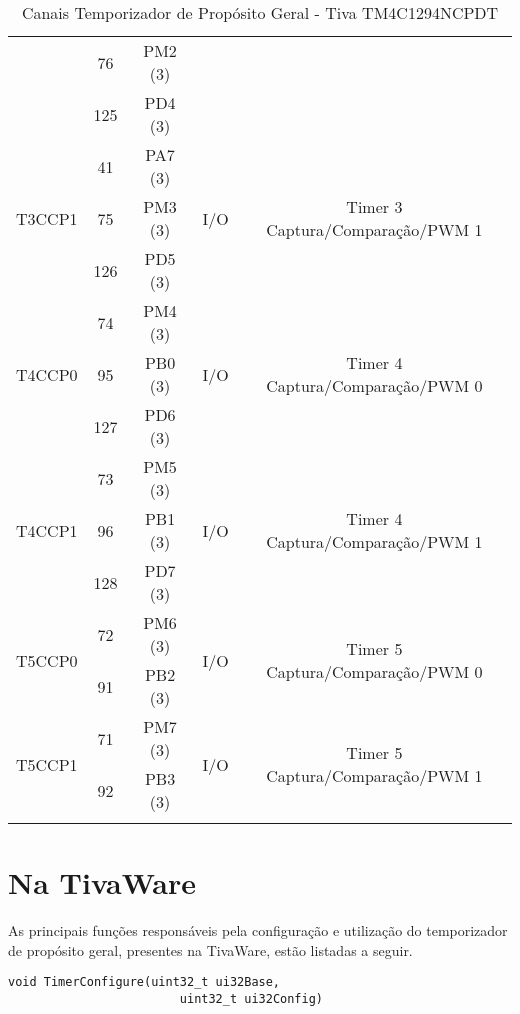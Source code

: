 \begin{center}
\begin{longtable}{|c|c|c|c|c|}
		& 76  & PM2 (3) &     &                                 \\ 
		& 125 & PD4 (3) &     &                                 \\ \hline
		\multirow{3}{*}{T3CCP1}    & 41  & PA7 (3) & \multirow{3}{*}{I/O} & \multirow{3}{*}{Timer 3 Captura/Comparação/PWM 1}\\
		& 75  & PM3 (3) &     &                                 \\ 
		& 126 & PD5 (3) &     &                                 \\ \hline
		\multirow{3}{*}{T4CCP0}    & 74  & PM4 (3) & \multirow{3}{*}{I/O} & \multirow{3}{*}{Timer 4 Captura/Comparação/PWM 0}\\
		& 95  & PB0 (3) &     &                                 \\ 
		& 127 & PD6 (3) &     &                                 \\ \hline
		\multirow{3}{*}{T4CCP1}    & 73  & PM5 (3) & \multirow{3}{*}{I/O} & \multirow{3}{*}{Timer 4 Captura/Comparação/PWM 1}\\
		& 96  & PB1 (3) &     &                                 \\ 
		& 128 & PD7 (3) &     &                                 \\ \hline
		\multirow{2}{*}{T5CCP0}    & 72  & PM6 (3) & \multirow{2}{*}{I/O} & \multirow{2}{*}{Timer 5 Captura/Comparação/PWM 0}\\
		& 91  & PB2 (3) &     &                                 \\ \hline
		\multirow{2}{*}{T5CCP1}    & 71  & PM7 (3) & \multirow{2}{*}{I/O} & \multirow{2}{*}{Timer 5 Captura/Comparação/PWM 1}\\
		& 92  & PB3 (3) &     &                                 \\ \hline
		\caption{Canais Temporizador de Propósito Geral - Tiva TM4C1294NCPDT \cite{DATASHEET_TIVA} }
		\label{tab:CanaisTimer}
	\end{longtable}
\end{center}

\section{Na TivaWare}

As principais funções responsáveis pela configuração e utilização do temporizador de propósito geral, presentes na TivaWare, estão listadas a seguir.

\begin{lstlisting}[style=funcao]
	void TimerConfigure(uint32_t ui32Base,
						uint32_t ui32Config)
\end{lstlisting}

